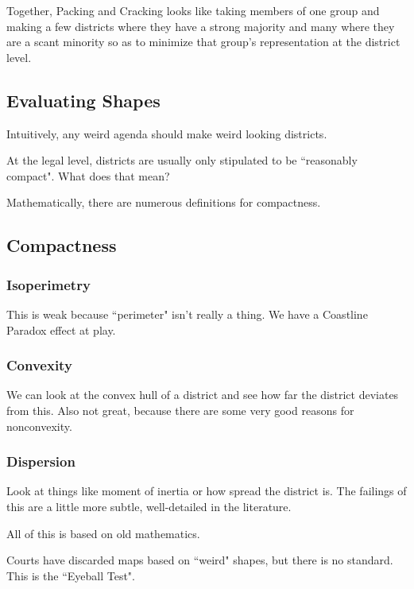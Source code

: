 Together, Packing and Cracking looks like taking members of one group and making a few districts where they have a strong majority and many where they are a scant minority so as to minimize that group's representation at the district level.

\subsection*{Evaluating Shapes}

Intuitively, any weird agenda should make weird looking districts.

At the legal level, districts are usually only stipulated to be ``reasonably compact".  What does that mean?

Mathematically, there are numerous definitions for compactness.
\subsection*{Compactness}

\subsubsection*{Isoperimetry}

  This is weak because ``perimeter" isn't really a thing.  We have a Coastline Paradox effect at play.

\subsubsection*{Convexity}

We can look at the convex hull of a district and see how far the district deviates from this.  Also not great, because there are some very good reasons for nonconvexity.

\subsubsection*{Dispersion}

Look at things like moment of inertia or how spread the district is.  The failings of this are a little more subtle, well-detailed in the literature.
	
	
All of this is based on old mathematics.

Courts have discarded maps based on ``weird" shapes, but there is no standard.  This is the ``Eyeball Test".

